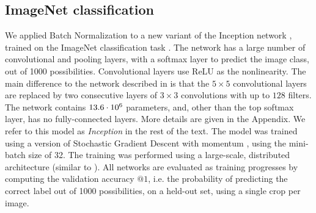 \documentclass[twocolumn]{article}
\begin{document}
\subsection{ImageNet classification}
\label{sec-results}

We applied Batch Normalization to a new variant of the Inception network \cite{inception},
trained on the ImageNet classification task \cite{imagenet}. The network has a large
number of convolutional and pooling layers, with a softmax layer to predict the
image class, out of 1000 possibilities. Convolutional layers use ReLU as the
nonlinearity. The main difference to the network described in \cite{inception} is that
the $5\times 5$ convolutional layers are replaced by two consecutive layers of $3\times 3$ convolutions
with up to $128$ filters. The network contains $13.6\cdot 10^6$ parameters, and, other than the top softmax layer, has no fully-connected layers.  More details are given in the Appendix.  We refer to this model as {\sl Inception} in the rest of the text. The model was trained using a version of Stochastic Gradient Descent with momentum
\cite{momentum}, using the mini-batch size of 32. The training was performed using a large-scale, distributed architecture (similar to \cite{dist-belief}).
All networks are evaluated as training progresses by computing the validation accuracy $@1$, i.e. the
probability of predicting the correct label out of 1000 possibilities, on a held-out set, using a single crop per image.
\end{document}
